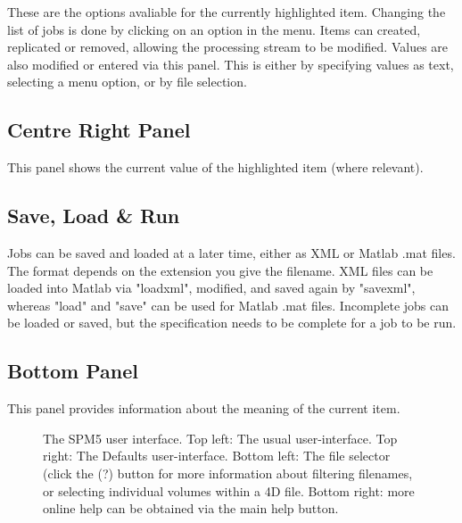 \documentclass[a4paper,titlepage]{book}
\begin{document}
These are the options avaliable for the currently highlighted item. Changing the list of jobs is done by clicking on an option in the menu. Items can created, replicated or removed, allowing the processing stream to be modified. Values are also modified or entered via this panel. This is either by specifying values as text, selecting a menu option, or by file selection.




\subsection*{Centre Right Panel}

This panel shows the current value of the highlighted item (where relevant).




\subsection*{Save, Load \& Run}

Jobs can be saved and loaded at a later time, either as XML or Matlab .mat files.  The format depends on the extension you give the filename. XML files can be loaded into Matlab via "loadxml", modified, and saved again by "savexml", whereas "load" and "save" can be used for Matlab .mat files. Incomplete jobs can be loaded or saved, but the specification needs to be complete for a job to be run.


\subsection*{Bottom Panel}

This panel provides information about the meaning of the current item.

\begin{figure} \begin{center}    \end{center} \caption{The SPM5 user interface. Top left: The usual user-interface.  Top right: The Defaults user-interface. Bottom left: The file selector (click the (?) button for more information about filtering filenames, or selecting individual volumes within a 4D file. Bottom right: more online help can be obtained via the main help button.} \end{figure} 
\end{document}
